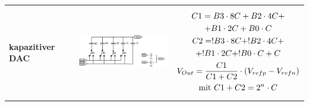 \begin{longtable}{|l|l|l|}
\begin{minipage}{8cm}
\end{minipage}
\\
\hline

\begin{minipage}{4cm}
\textbf{kapazitiver DAC}
\end{minipage}
&
\begin{minipage}{6cm}
\includegraphics[width=6cm, height = 3.5cm]{pictures/kapazitiverDAC}
\end{minipage}
&
\begin{minipage}{8cm}
\begin{gather}
C1=B3\cdot 8C+B2\cdot 4C+\notag\\+B1\cdot 2C+B0\cdot C\\
C2=!B3\cdot 8C+!B2\cdot 4C+\notag\\+!B1\cdot 2C+!B0\cdot C+C\\
V_{Out}=\frac{C1}{C1+C2}\cdot (V_{refp}-V_{refn})\\
\text{mit } C1+C2=2^n\cdot C
\end{gather}

\end{minipage}
\\
\hline
\end{longtable}
\newpage


